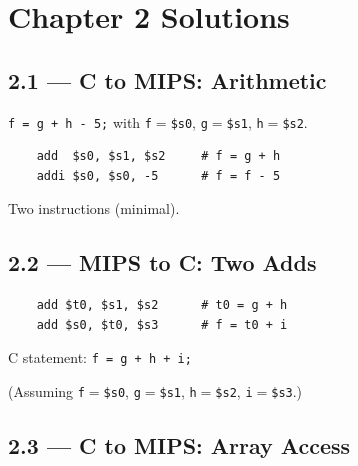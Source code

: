 \newpage
\section*{Chapter 2 Solutions}

\subsection*{2.1 --- C to MIPS: Arithmetic}
\hypertarget{sol-2.1}{}

\texttt{f = g + h - 5;} with \texttt{f}$=$\texttt{\$s0},
\texttt{g}$=$\texttt{\$s1}, \texttt{h}$=$\texttt{\$s2}.

\begin{verbatim}
    add  $s0, $s1, $s2     # f = g + h
    addi $s0, $s0, -5      # f = f - 5
\end{verbatim}
Two instructions (minimal).

\subsection*{2.2 --- MIPS to C: Two Adds}
\hypertarget{sol-2.2}{}

\begin{verbatim}
    add $t0, $s1, $s2      # t0 = g + h
    add $s0, $t0, $s3      # f = t0 + i
\end{verbatim}
C statement: \texttt{f = g + h + i;}

(Assuming \texttt{f}$=$\texttt{\$s0}, \texttt{g}$=$\texttt{\$s1},
\texttt{h}$=$\texttt{\$s2}, \texttt{i}$=$\texttt{\$s3}.)

\subsection*{2.3 --- C to MIPS: Array Access}
\hypertarget{sol-2.3}{}

